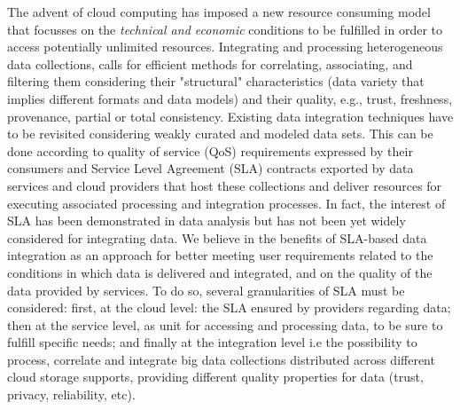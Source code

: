%


\color{black}
The advent of cloud computing has imposed a new   resource consuming model that focusses on
 the \textit{technical and economic} conditions to be fulfilled in order to access potentially unlimited resources. Integrating and processing heterogeneous data collections, calls for efficient methods for correlating, associating, and filtering them considering their "structural" characteristics (data variety that implies different formats and data models) and  their quality, e.g., trust, freshness, provenance, partial or total consistency. 
Existing data integration techniques have to be revisited considering weakly curated and modeled data sets. This can be done according to quality of service (QoS) requirements expressed by their consumers and Service Level Agreement (SLA) contracts exported by data services and cloud providers that host  these collections and deliver resources for executing  associated processing and integration processes.
In fact,  the interest of SLA has been demonstrated  in data analysis but has not been yet widely considered for integrating data. 
We believe in the benefits of SLA-based data integration as an approach for better meeting  user  requirements related to the conditions in which data is delivered and integrated, and on the quality of the data provided by services.
To do so, several granularities of SLA must be considered: first, at the cloud level: the SLA ensured by providers regarding data; then at the service level, as unit for accessing and processing data, to be sure to fulfill  specific  needs; and finally at the integration level i.e the possibility to process, correlate and integrate big data collections distributed across different cloud storage supports, providing different quality properties for data (trust, privacy, reliability, etc).


